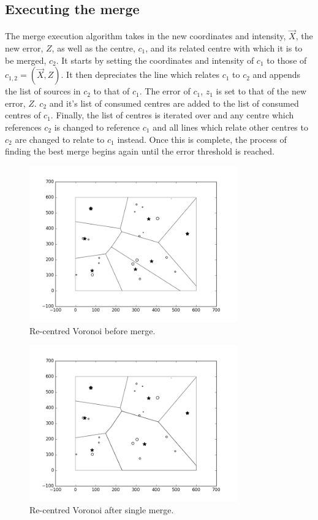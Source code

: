 \subsection{Executing the merge}
The merge execution algorithm takes in the new coordinates and intensity, $\vec{X}$, the new error, $Z$, as well as the centre, $c_1$, and its related centre with which it is to be merged, $c_2$. It starts by setting the coordinates and intensity of $c_1$ to those of $c_{1,2} = (\vec{X},Z)$. It then depreciates the line which relates $c_1$ to $c_2$ and appends the list of sources in $c_2$ to that of $c_1$. The error of $c_1$, $z_1$ is set to that of the new error, $Z$. $c_2$ and it's list of consumed centres are added to the list of consumed centres of $c_1$. Finally, the list of centres is iterated over and any centre which references $c_2$ is changed to reference $c_1$ and all lines which relate other centres to $c_2$ are changed to relate to $c_1$ instead. Once this is complete, the process of finding the best merge begins again until the error threshold is reached.
\begin{figure}[H]
  \centering
  \includegraphics[width=0.8\textwidth]{Images/1merge1.png}
  \caption{Re-centred Voronoi before merge.}
  \label{fig:1merge1}
\end{figure}
\begin{figure}[H]
\centering
  \includegraphics[width=0.8\textwidth]{Images/1merge2.png}
  \caption{Re-centred Voronoi after single merge.}
  \label{fig:1merge2}
\end{figure}
